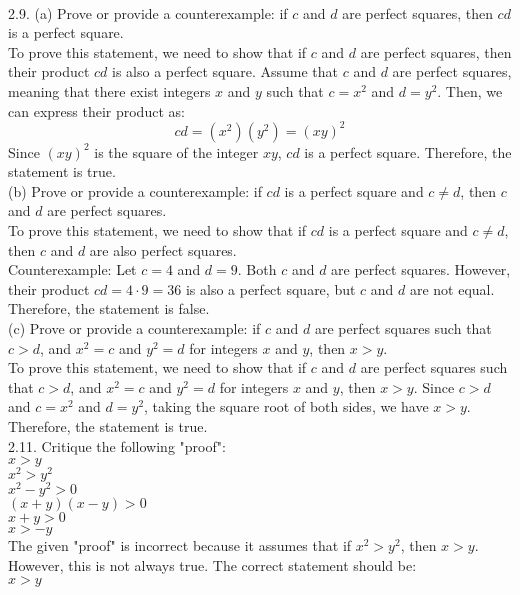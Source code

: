 \documentclass{article}
\begin{document}
\\[2\baselineskip]2.9. (a) Prove or provide a counterexample: if $c$ and $d$ are perfect squares, then $cd$ is a perfect square.
\\[2\baselineskip]To prove this statement, we need to show that if $c$ and $d$ are perfect squares, then their product $cd$ is also a perfect square. Assume that $c$ and $d$ are perfect squares, meaning that there exist integers $x$ and $y$ such that $c = x^2$ and $d = y^2$. Then, we can express their product as:
\\[2\baselineskip]\[cd = (x^2)(y^2) = (xy)^2\] Since $(xy)^2$ is the square of the integer $xy$, $cd$ is a perfect square. Therefore, the statement is true.
\\[2\baselineskip](b) Prove or provide a counterexample: if $cd$ is a perfect square and $c \neq d$, then $c$ and $d$ are perfect squares.
\\[2\baselineskip]To prove this statement, we need to show that if $cd$ is a perfect square and $c \neq d$, then $c$ and $d$ are also perfect squares.
\\[2\baselineskip]Counterexample: Let $c = 4$ and $d = 9$. Both $c$ and $d$ are perfect squares. However, their product $cd = 4 \cdot 9 = 36$ is also a perfect square, but $c$ and $d$ are not equal. Therefore, the statement is false.
\\[2\baselineskip](c) Prove or provide a counterexample: if $c$ and $d$ are perfect squares such that $c > d$, and $x^2 = c$ and $y^2 = d$ for integers $x$ and $y$, then $x > y$.
\\[2\baselineskip]To prove this statement, we need to show that if $c$ and $d$ are perfect squares such that $c > d$, and $x^2 = c$ and $y^2 = d$ for integers $x$ and $y$, then $x > y$. Since $c > d$ and $c = x^2$ and $d = y^2$, taking the square root of both sides, we have $x > y$. Therefore, the statement is true.
\\[2\baselineskip]2.11. Critique the following "proof":
\\[2\baselineskip]$x > y$
\\$x^2 > y^2$
\\$x^2 - y^2 > 0$
\\$(x + y)(x - y) > 0$
\\$x + y > 0$
\\$x > -y$
\\[2\baselineskip]The given "proof" is incorrect because it assumes that if $x^2 > y^2$, then $x > y$. However, this is not always true. The correct statement should be:
\\[2\baselineskip]$x > y$
\end{document}
